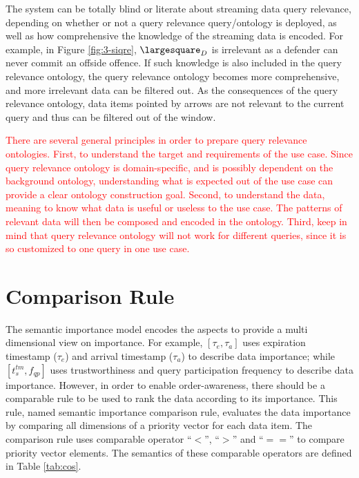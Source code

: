 The system can be totally blind or literate about streaming data query relevance, depending on whether or not a query relevance query/ontology is deployed, as well as how comprehensive the knowledge of the streaming data is encoded. 
For example, in Figure \ref{fig:3-siqre}, $\largesquare_{D}$ is irrelevant as a defender can never commit an offside offence. 
If such knowledge is also included in the query relevance ontology, the query relevance ontology becomes more comprehensive, and more irrelevant data can be filtered out. 
As the consequences of the query relevance ontology, data items pointed by arrows are not relevant to the current query and thus can be filtered out of the window.

\textcolor{red}{
There are several general principles in order to prepare query relevance ontologies.
First, to understand the target and requirements of the use case. 
Since query relevance ontology is domain-specific, and is possibly dependent on the background ontology, understanding what is expected out of the use case can provide a clear ontology construction goal. 
Second, to understand the data, meaning to know what data is useful or useless to the use case.
The patterns of relevant data will then be composed and encoded in the ontology.
Third, keep in mind that query relevance ontology will not work for different queries, since it is so customized to one query in one use case.}
%
\section{Comparison Rule}
The semantic importance model encodes the aspects to provide a multi dimensional view on importance.
For example, $[\tau_{e}, \tau_{a}]$ uses expiration timestamp ($\tau_{e}$) and arrival timestamp ($\tau_{a}$) to describe data importance; while $[t^{tm}_{s}, f_{qp}]$ uses trustworthiness and query participation frequency to describe data importance. 
However, in order to enable order-awareness, there should be a comparable rule to be used to rank the data according to its importance. 
This rule, named semantic importance comparison rule, evaluates the data importance by comparing all dimensions of a priority vector for each data item. 
The comparison rule uses comparable operator ``$<$'', ``$>$'' and ``$==$'' to compare priority vector elements. 
The semantics of these comparable operators are defined in Table \ref{tab:cos}.

